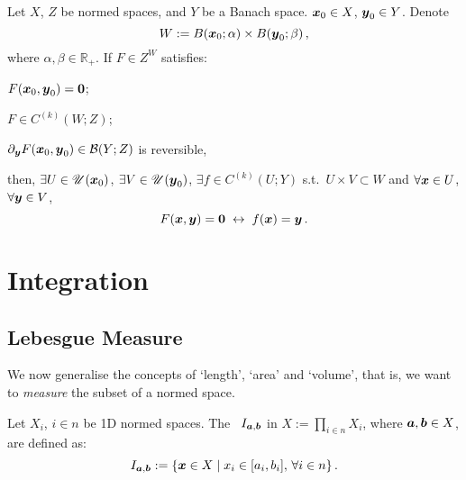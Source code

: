 \documentclass[openany]{book}
\begin{document}
\begin{theorem}
	\label{theorem: nth continuous differentiability of implicit function}
	Let $X$, $Z$ be normed spaces, and $Y$ be a Banach space.
	$\boldsymbol{x}_0 \in X$, $\boldsymbol{y}_0 \in Y$. Denote
	\begin{equation*}
		W := B(\boldsymbol{x}_0; \alpha) \times B(\boldsymbol{y}_0; \beta)\,,
	\end{equation*}
	where $\alpha, \beta \in \mathbb R_+$.
	If $F \in Z^W$ satisfies:
	\begin{conditionlist}[label=\alph*)]
		\item $F(\boldsymbol{x}_0, \boldsymbol{y}_0) = \boldsymbol{0}$;
		\item $F \in C^{(k)}(W; Z)$; 
		\item $\partial_{\boldsymbol{y}} F(\boldsymbol{x}_0, \boldsymbol{y}_0) \in \mathcal B(Y; Z)$ is reversible,
	\end{conditionlist}
	then, $\exists U \in \mathscr U(\boldsymbol{x}_0)$, $\exists V \in \mathscr U(\boldsymbol{y}_0)$, $\exists f \in C^{(k)}(U; Y)$ s.t.\ $U \times V \subset W$ and $\forall \boldsymbol{x} \in U$, $\forall \boldsymbol{y} \in V$, 
	\begin{equation*}
		F(\boldsymbol{x}, \boldsymbol{y}) = \boldsymbol{0}
		\;\leftrightarrow\;
		f(\boldsymbol{x}) = \boldsymbol{y}\,.
	\end{equation*}
\end{theorem}





\chapter{Integration}

\section{Lebesgue Measure}

We now generalise the concepts of `length', `area' and `volume', that is, we want to \emph{measure} the subset of a normed space.


\begin{definition}[Cuboid]
	Let $X_i$, $i \in n$ be 1D normed spaces. 
	The ~$I_{\boldsymbol{a}, \boldsymbol{b}}$ in $X := \prod_{i \in n} X_i$, where $\boldsymbol{a}, \boldsymbol{b} \in X$, are defined as:
	\begin{equation*}
		I_{\boldsymbol{a}, \boldsymbol{b}} 
			:= \{\boldsymbol{x} \in X \mid x_i \in  [a_i, b_i],\, \forall i \in n\}\,.
	\end{equation*}
\end{definition}
\end{document}
